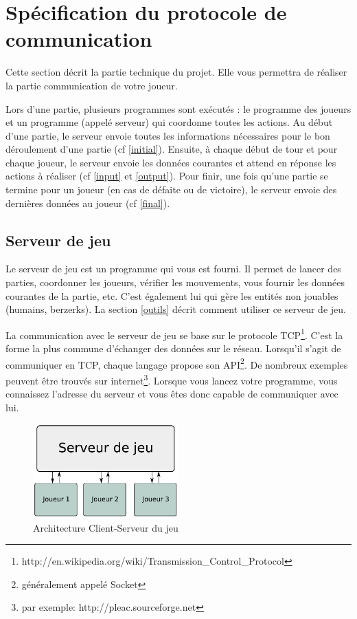 \lstset{numbers=none}

\section{Spécification du protocole de communication} %

Cette section décrit la partie technique du projet.
Elle vous permettra de réaliser la partie communication de votre joueur.

Lors d'une partie, plusieurs programmes sont exécutés : le programme des joueurs et un programme (appelé serveur) qui coordonne toutes les actions.
Au début d'une partie, le serveur envoie toutes les informations nécessaires pour le bon déroulement d'une partie (cf \ref{initial}).
Ensuite, à chaque début de tour et pour chaque joueur, le serveur envoie les données courantes et attend en réponse les actions à réaliser (cf \ref{input} et \ref{output}).
Pour finir, une fois qu'une partie se termine pour un joueur (en cas de défaite ou de victoire), le serveur envoie des dernières données au joueur (cf \ref{final}).

\subsection{Serveur de jeu} %

Le serveur de jeu est un programme qui vous est fourni.
Il permet de lancer des parties, coordonner les joueurs, vérifier les mouvements, vous fournir les données courantes de la partie, etc.
C'est également lui qui gère les entités non jouables (humains, berzerks).
La section \ref{outils} décrit comment utiliser ce serveur de jeu.

La communication avec le serveur de jeu se base sur le protocole TCP\footnote{http://en.wikipedia.org/wiki/Transmission\_Control\_Protocol}.
C'est la forme la plus commune d'échanger des données sur le réseau.
Lorsqu'il s'agit de communiquer en TCP, chaque langage propose son API\footnote{généralement appelé Socket}.
De nombreux exemples peuvent être trouvés sur internet\footnote{par exemple: http://pleac.sourceforge.net}.
Lorsque vous lancez votre programme, vous connaissez l'adresse du serveur et vous êtes donc capable de communiquer avec lui.

\begin{figure}[htbp]
    \centering
    \includegraphics[width=0.5\textwidth]{pics/archi_client_serveur}
    \caption{Architecture Client-Serveur du jeu}
    \label{archi}
\end{figure}

